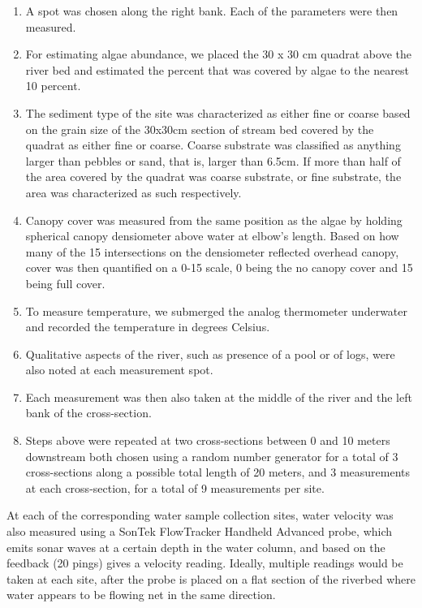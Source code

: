 \documentclass{article}
\begin{document}
\begin{enumerate}
\item A spot was chosen along the right bank. Each of the parameters were then measured.
\item For estimating algae abundance, we placed the 30  x 30 cm quadrat above the river bed and estimated the percent that was covered by algae to the nearest 10 percent.

\item The sediment type of the site was characterized as either fine or coarse based on the grain size of the 30x30cm section of stream bed covered by the quadrat as either fine or coarse. Coarse substrate was classified as anything larger than pebbles or sand, that is, larger than 6.5cm. If more than half of the area covered by the quadrat was coarse substrate, or fine substrate, the area was characterized as such respectively.

\item Canopy cover was measured from the same position as the algae by holding spherical canopy densiometer above water at elbow's length. Based on how many of the 15 intersections on the densiometer reflected overhead canopy, cover was then quantified on a 0-15 scale, 0 being the no canopy cover and 15 being full cover.

\item To measure temperature, we submerged the analog thermometer underwater and recorded the temperature in degrees Celsius.

\item Qualitative aspects of the river, such as presence of a pool or of logs, were also noted at each measurement spot.

\item Each measurement was then also taken at the middle of the river and the left bank of the cross-section. 

\item Steps above were repeated at two cross-sections between 0 and 10 meters downstream both chosen using a random number generator for a total of 3 cross-sections along a possible total length of 20 meters, and 3 measurements at each cross-section, for a total of 9 measurements per site. 
\end{enumerate}

At each of the corresponding water sample collection sites, water velocity was also measured using a SonTek FlowTracker Handheld Advanced probe, which emits sonar waves at a certain depth in the water column, and based on the feedback (20 pings) gives a velocity reading. Ideally, multiple readings would be taken at each site, after the probe is placed on a flat section of the riverbed where water appears to be flowing net in the same direction. 
\end{document}
